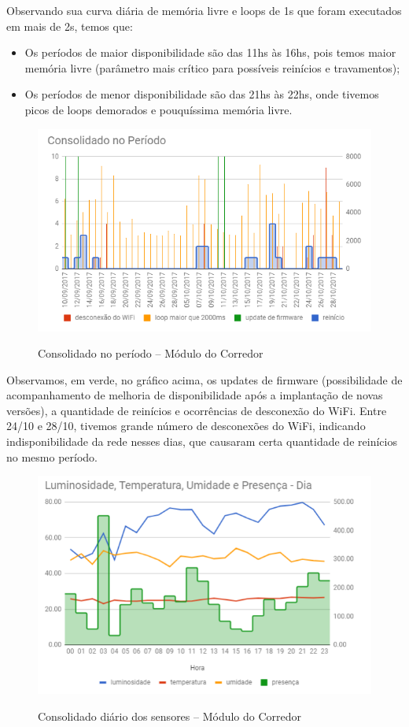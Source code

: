 Observando sua curva diária de memória livre e loops de 1s que foram executados em mais de 2s, temos que:

\begin{itemize}
	\item Os períodos de maior disponibilidade são das 11hs às 16hs, pois temos maior memória livre (parâmetro mais crítico para possíveis reinícios e travamentos);
	\item Os períodos de menor disponibilidade são das 21hs às 22hs, onde tivemos picos de loops demorados e pouquíssima memória livre.
\end{itemize}

\begin{figure}[H]
	\centering
	\caption{Consolidado no período -- Módulo do Corredor}
	\includegraphics[width=1.0\textwidth]{periodoCorredor}
	\label{fig:periodoCorredor}
\end{figure}

Observamos, em verde, no gráfico acima, os updates de firmware (possibilidade de acompanhamento de melhoria de disponibilidade após a implantação de novas versões), a quantidade de reinícios e ocorrências de desconexão do WiFi. Entre 24/10 e 28/10, tivemos grande número de desconexões do WiFi, indicando indisponibilidade da rede nesses dias, que causaram certa quantidade de reinícios no mesmo período.

\begin{figure}[H]
	\centering
	\caption{Consolidado diário dos sensores -- Módulo do Corredor}
	\includegraphics[width=1.0\textwidth]{sensoresdiaCorredor}
	\label{fig:sensoresdiaCorredor}
\end{figure}

